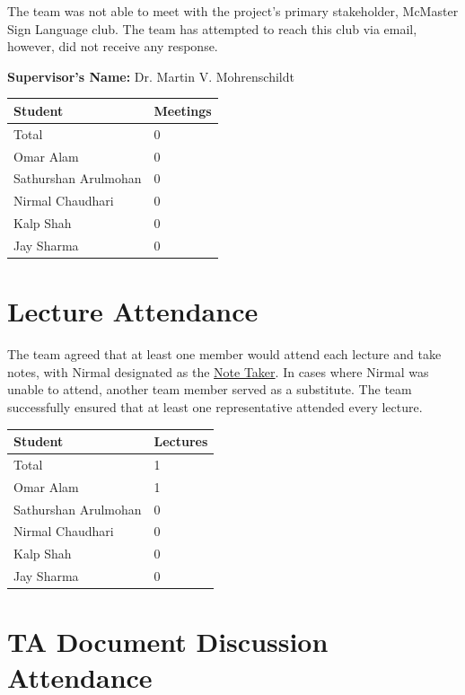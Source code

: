\documentclass{article}
\begin{document}
The team was not able to meet with the project's primary stakeholder, McMaster
Sign Language club. The team has attempted to reach this club via email,
however, did not receive any response.

\noindent \textbf{Supervisor's Name: }Dr. Martin V. Mohrenschildt

\begin{table}[H]
\centering
\begin{tabular}{ll}
\toprule
\textbf{Student} & \textbf{Meetings}\\
\midrule
Total & 0\\
Omar Alam & 0 \\
Sathurshan Arulmohan & 0 \\
Nirmal Chaudhari & 0 \\
Kalp Shah & 0 \\
Jay Sharma & 0 \\
\bottomrule
\end{tabular}
\end{table}

\section{Lecture Attendance}

The team agreed that at least one member would attend each lecture and take
notes, with Nirmal designated as the
\hyperref[DevPlan-role:note_taker]{Note Taker}. In cases where Nirmal
was unable to attend, another team member served as a substitute. The team
successfully ensured that at least one representative attended every lecture.

\begin{table}[H]
\centering
\begin{tabular}{ll}
\toprule
\textbf{Student} & \textbf{Lectures}\\
\midrule
Total & 1\\
Omar Alam & 1 \\
Sathurshan Arulmohan & 0 \\
Nirmal Chaudhari & 0 \\
Kalp Shah & 0 \\
Jay Sharma & 0 \\
\bottomrule
\end{tabular}
\end{table}

\section{TA Document Discussion Attendance}
\end{document}
